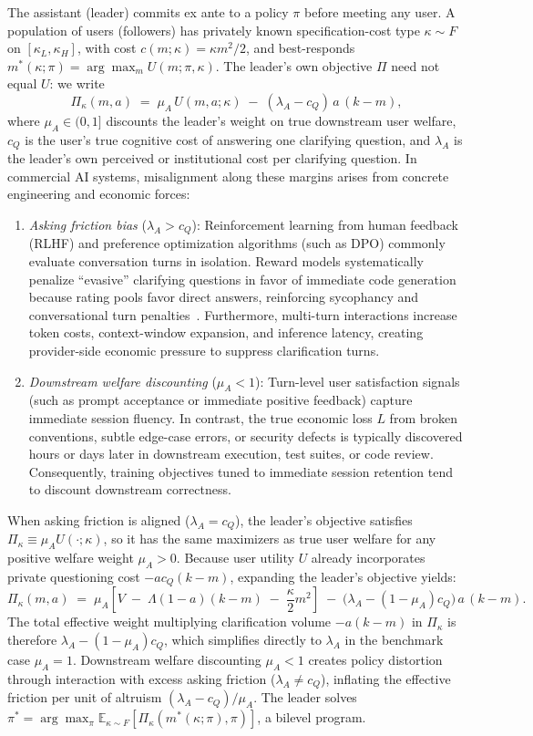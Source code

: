 \documentclass[11pt]{article}
\begin{document}
The assistant (leader) commits ex ante to a policy $\pi$ before meeting any user.
A population of users (followers) has privately known specification-cost type
$\kappa \sim F$ on $[\kappa_L,\kappa_H]$, with cost $c(m;\kappa)=\kappa m^2/2$, and
best-responds $m^*(\kappa;\pi) = \arg\max_m U(m;\pi,\kappa)$. The leader's own
objective $\Pi$ need not equal $U$: we write
\[
\Pi_\kappa(m,a) \;=\; \mu_A\, U(m,a;\kappa) \;-\; (\lambda_A - c_Q)\, a\,(k-m),
\]
where $\mu_A \in (0,1]$ discounts the leader's weight on true downstream user welfare, $c_Q$ is the user's true cognitive cost of answering one clarifying question, and $\lambda_A$ is the leader's own perceived or institutional cost per clarifying question. In commercial AI systems, misalignment along these margins arises from concrete engineering and economic forces:
\begin{enumerate}[leftmargin=*]
\item \emph{Asking friction bias} ($\lambda_A > c_Q$): Reinforcement learning from human feedback (RLHF) and preference optimization algorithms (such as DPO) commonly evaluate conversation turns in isolation. Reward models systematically penalize ``evasive'' clarifying questions in favor of immediate code generation because rating pools favor direct answers, reinforcing sycophancy and conversational turn penalties~\citep{sharma2023,singhal2023,laban2025}. Furthermore, multi-turn interactions increase token costs, context-window expansion, and inference latency, creating provider-side economic pressure to suppress clarification turns.
\item \emph{Downstream welfare discounting} ($\mu_A < 1$): Turn-level user satisfaction signals (such as prompt acceptance or immediate positive feedback) capture immediate session fluency. In contrast, the true economic loss $L$ from broken conventions, subtle edge-case errors, or security defects is typically discovered hours or days later in downstream execution, test suites, or code review. Consequently, training objectives tuned to immediate session retention tend to discount downstream correctness.
\end{enumerate}
When asking friction is aligned ($\lambda_A = c_Q$), the leader's objective satisfies $\Pi_\kappa \equiv \mu_A U(\cdot;\kappa)$, so it has the same maximizers as true user welfare for any positive welfare weight $\mu_A > 0$. Because user utility $U$ already incorporates private questioning cost $-a c_Q (k-m)$, expanding the leader's objective yields:
\[
\Pi_\kappa(m,a) \;=\; \mu_A\left[ V \;-\; \Lambda(1-a)(k-m) \;-\; \frac{\kappa}{2}m^2 \right] \;-\; \Big( \lambda_A - (1 - \mu_A)c_Q \Big)\,a\,(k-m).
\]
The total effective weight multiplying clarification volume $-a(k-m)$ in $\Pi_\kappa$ is therefore $\lambda_A - (1 - \mu_A)c_Q$, which simplifies directly to $\lambda_A$ in the benchmark case $\mu_A = 1$. Downstream welfare discounting $\mu_A < 1$ creates policy distortion through interaction with excess asking friction ($\lambda_A \ne c_Q$), inflating the effective friction per unit of altruism $(\lambda_A - c_Q)/\mu_A$. The leader solves $\pi^* = \arg\max_\pi \mathbb{E}_{\kappa\sim F}[\Pi_\kappa(m^*(\kappa;\pi),\pi)]$, a bilevel program.
\end{document}
